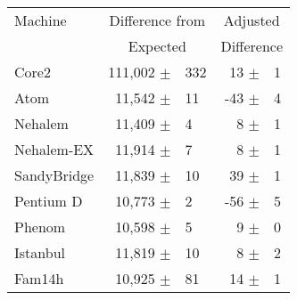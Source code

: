 %
%
%
\begin{tabular}{|l||rl|rl|}

\hline
Machine   & \multicolumn{2}{c|}{Difference from} & \multicolumn{2}{c|}{Adjusted} \\
          & \multicolumn{2}{c|}{Expected} & \multicolumn{2}{c|}{Difference} \\
\hline
\hline

Core2          & 111,002 $\pm$ & 332         &        13 $\pm$ & 1 \\
\hline
Atom           & 11,542 $\pm$ & 11           &       -43 $\pm$ & 4 \\
\hline
Nehalem        & 11,409 $\pm$ & 4            &         8 $\pm$ & 1 \\
\hline
Nehalem-EX     & 11,914 $\pm$ & 7            &         8 $\pm$ & 1 \\
\hline
SandyBridge    & 11,839 $\pm$ & 10           &        39 $\pm$ & 1 \\
\hline
Pentium D      & 10,773 $\pm$ & 2            &       -56 $\pm$ & 5 \\
\hline
Phenom         & 10,598 $\pm$ & 5            &         9 $\pm$ & 0 \\
\hline
Istanbul       & 11,819 $\pm$ & 10           &        8 $\pm$ & 2  \\
\hline
Fam14h         & 10,925 $\pm$ & 81           &       14 $\pm$ & 1  \\
\hline
\end{tabular}

